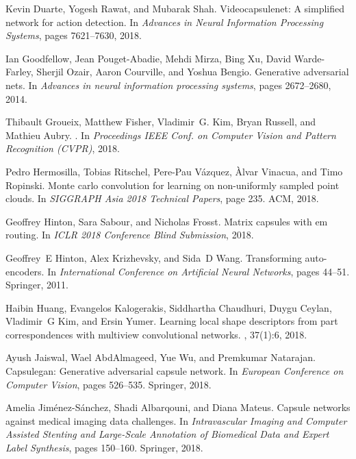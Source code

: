 \documentclass[10pt,twocolumn,letterpaper]{article}
\theoremstyle{break}
\begin{document}
{\begin{thebibliography}{10}
Kevin Duarte, Yogesh Rawat, and Mubarak Shah.
\newblock Videocapsulenet: A simplified network for action detection.
\newblock In {\em Advances in Neural Information Processing Systems}, pages
  7621--7630, 2018.

Ian Goodfellow, Jean Pouget-Abadie, Mehdi Mirza, Bing Xu, David Warde-Farley,
  Sherjil Ozair, Aaron Courville, and Yoshua Bengio.
\newblock Generative adversarial nets.
\newblock In {\em Advances in neural information processing systems}, pages
  2672--2680, 2014.

Thibault Groueix, Matthew Fisher, Vladimir~G. Kim, Bryan Russell, and Mathieu
  Aubry.
.
\newblock In {\em Proceedings IEEE Conf. on Computer Vision and Pattern
  Recognition (CVPR)}, 2018.

Pedro Hermosilla, Tobias Ritschel, Pere-Pau V{\'a}zquez, {\`A}lvar Vinacua, and
  Timo Ropinski.
\newblock Monte carlo convolution for learning on non-uniformly sampled point
  clouds.
\newblock In {\em SIGGRAPH Asia 2018 Technical Papers}, page 235. ACM, 2018.

Geoffrey Hinton, Sara Sabour, and Nicholas Frosst.
\newblock Matrix capsules with em routing.
\newblock In {\em ICLR 2018 Conference Blind Submission}, 2018.

Geoffrey~E Hinton, Alex Krizhevsky, and Sida~D Wang.
\newblock Transforming auto-encoders.
\newblock In {\em International Conference on Artificial Neural Networks},
  pages 44--51. Springer, 2011.

Haibin Huang, Evangelos Kalogerakis, Siddhartha Chaudhuri, Duygu Ceylan,
  Vladimir~G Kim, and Ersin Yumer.
\newblock Learning local shape descriptors from part correspondences with
  multiview convolutional networks.
, 37(1):6, 2018.

Ayush Jaiswal, Wael AbdAlmageed, Yue Wu, and Premkumar Natarajan.
\newblock Capsulegan: Generative adversarial capsule network.
\newblock In {\em European Conference on Computer Vision}, pages 526--535.
  Springer, 2018.

Amelia Jim{\'e}nez-S{\'a}nchez, Shadi Albarqouni, and Diana Mateus.
\newblock Capsule networks against medical imaging data challenges.
\newblock In {\em Intravascular Imaging and Computer Assisted Stenting and
  Large-Scale Annotation of Biomedical Data and Expert Label Synthesis}, pages
  150--160. Springer, 2018.


\end{thebibliography}}
\end{document}
